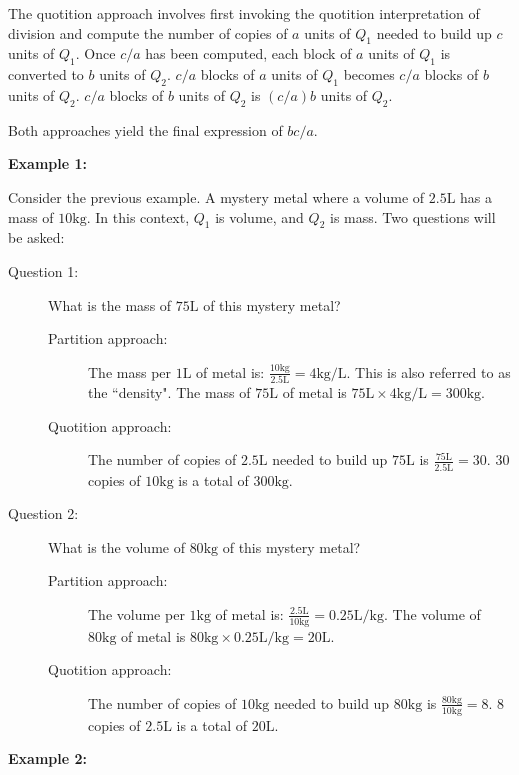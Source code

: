 \documentclass{article}
\begin{document}
The quotition approach involves first invoking the quotition interpretation of division and compute the number of copies of \(a\) units of \(Q_1\) needed to build up \(c\) units of \(Q_1\). Once \(c/a\) has been computed, each block of \(a\) units of \(Q_1\) is converted to \(b\) units of \(Q_2\). \(c/a\) blocks of \(a\) units of \(Q_1\) becomes \(c/a\) blocks of \(b\) units of \(Q_2\). \(c/a\) blocks of \(b\) units of \(Q_2\) is \((c/a)b\) units of \(Q_2\). 

Both approaches yield the final expression of \(bc/a\).

{\bf Example 1:}

Consider the previous example. A mystery metal where a volume of \(2.5\text{L}\) has a mass of \(10\text{kg}\). In this context, \(Q_1\) is volume, and \(Q_2\) is mass. Two questions will be asked:
\begin{description}
\item[Question 1:] What is the mass of \(75\text{L}\) of this mystery metal?
	\begin{description}
	\item[Partition approach:] The mass per \(1\text{L}\) of metal is: \(\frac{10\text{kg}}{2.5\text{L}} = 4\text{kg/L}\). This is also referred to as the ``density". The mass of \(75\text{L}\) of metal is \(75\text{L} \times 4\text{kg/L} = 300\text{kg}\).
	\item[Quotition approach:] The number of copies of \(2.5\text{L}\) needed to build up \(75\text{L}\) is \(\frac{75\text{L}}{2.5\text{L}} = 30\). \(30\) copies of \(10\text{kg}\) is a total of \(300\text{kg}\).
	\end{description}
\item[Question 2:] What is the volume of \(80\text{kg}\) of this mystery metal?
	\begin{description}
	\item[Partition approach:] The volume per \(1\text{kg}\) of metal is: \(\frac{2.5\text{L}}{10\text{kg}} = 0.25\text{L/kg}\). The volume of \(80\text{kg}\) of metal is \(80\text{kg} \times 0.25\text{L/kg} = 20\text{L}\).
	\item[Quotition approach:] The number of copies of \(10\text{kg}\) needed to build up \(80\text{kg}\) is \(\frac{80\text{kg}}{10\text{kg}} = 8\). \(8\) copies of \(2.5\text{L}\) is a total of \(20\text{L}\).
	\end{description}
\end{description}

{\bf Example 2:}
\end{document}
